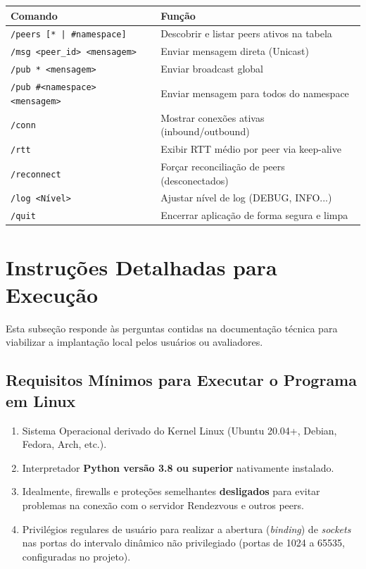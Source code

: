 \documentclass[12pt,a4paper]{article}
\begin{document}
\begin{table}[h]
\centering
\begin{tabular}{|l|l|}
\hline
\textbf{Comando} & \textbf{Função} \\ \hline
\texttt{/peers [* | \#namespace]} & Descobrir e listar peers ativos na tabela \\ \hline
\texttt{/msg <peer\_id> <mensagem>} & Enviar mensagem direta (Unicast) \\ \hline
\texttt{/pub * <mensagem>} & Enviar broadcast global \\ \hline
\texttt{/pub \#<namespace> <mensagem>} & Enviar mensagem para todos do namespace \\ \hline
\texttt{/conn} & Mostrar conexões ativas (inbound/outbound) \\ \hline
\texttt{/rtt} & Exibir RTT médio por peer via keep-alive \\ \hline
\texttt{/reconnect} & Forçar reconciliação de peers (desconectados) \\ \hline
\texttt{/log <Nível>} & Ajustar nível de log (DEBUG, INFO...) \\ \hline
\texttt{/quit} & Encerrar aplicação de forma segura e limpa \\ \hline
\end{tabular}
\end{table}

\section{Instruções Detalhadas para Execução}

Esta subseção responde às perguntas contidas na documentação técnica para viabilizar a implantação local pelos usuários ou avaliadores.

\subsection{Requisitos Mínimos para Executar o Programa em Linux}
\begin{enumerate}
    \item Sistema Operacional derivado do Kernel Linux (Ubuntu 20.04+, Debian, Fedora, Arch, etc.).
    \item Interpretador \textbf{Python versão 3.8 ou superior} nativamente instalado.
    \item Idealmente, firewalls e proteções semelhantes \textbf{desligados} para evitar problemas na conexão com o servidor Rendezvous e outros peers.
    \item Privilégios regulares de usuário para realizar a abertura (\textit{binding}) de \textit{sockets} nas portas do intervalo dinâmico não privilegiado (portas de 1024 a 65535, configuradas no projeto).
\end{enumerate}
\end{document}

